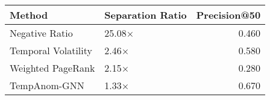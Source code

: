 \begin{tabular}{llr}
\toprule
Method & Separation Ratio & Precision@50 \\
\midrule
Negative Ratio & 25.08× & 0.460 \\
Temporal Volatility & 2.46× & 0.580 \\
Weighted PageRank & 2.15× & 0.280 \\
TempAnom-GNN & 1.33× & 0.670 \\
\bottomrule
\end{tabular}
